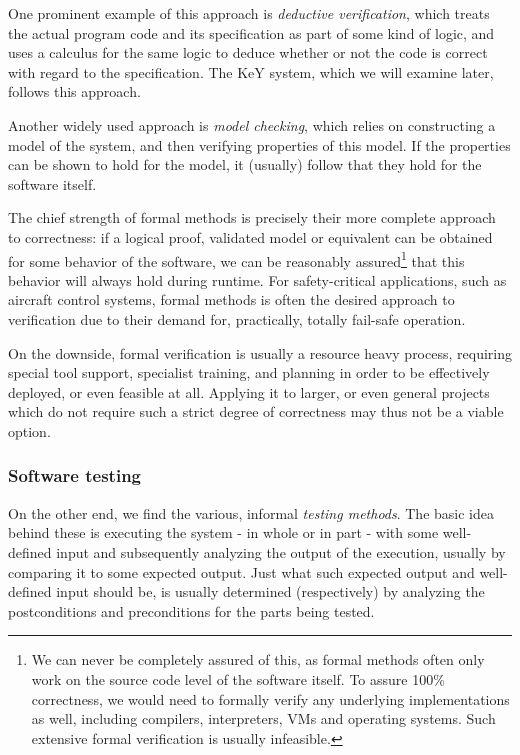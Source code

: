 \documentclass{article}
\newcommand{\tmem}[1]{{\em #1\/}}
\begin{document}
One prominent example of this approach is {\tmem{deductive verification}},
which treats the actual program code and its specification as part of some
kind of logic, and uses a calculus for the same logic to deduce whether or not
the code is correct with regard to the specification. The KeY system, which we
will examine later, follows this approach.

Another widely used approach is {\tmem{model checking}}, which relies on
constructing a model of the system, and then verifying properties of this
model. If the properties can be shown to hold for the model, it (usually)
follow that they hold for the software itself.



The chief strength of formal methods is precisely their more complete approach
to correctness: if a logical proof, validated model or equivalent can be
obtained for some behavior of the software, we can be reasonably
assured{\footnote{We can never be completely assured of this, as formal
methods often only work on the source code level of the software itself. To
assure 100\% correctness, we would need to formally verify any underlying
implementations as well, including compilers, interpreters, VMs and operating
systems. Such extensive formal verification is usually infeasible.}} that this
behavior will always hold during runtime. For safety-critical applications,
such as aircraft control systems, formal methods is often the desired approach
to verification due to their demand for, practically, totally fail-safe
operation.



On the downside, formal verification is usually a resource heavy process,
requiring special tool support, specialist training, and planning in order to
be effectively deployed, or even feasible at all. Applying it to larger, or
even general projects which do not require such a strict degree of correctness
may thus not be a viable option.



\subsubsection{Software testing}

On the other end, we find the various, informal {\tmem{testing methods}}. The
basic idea behind these is executing the system - in whole or in part - with
some well-defined input and subsequently analyzing the output of the
execution, usually by comparing it to some expected output. Just what such
expected output and well-defined input should be, is usually determined
(respectively) by analyzing the postconditions and preconditions for the parts
being tested.
\end{document}
